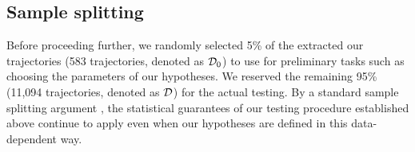 \subsection{Sample splitting}

Before proceeding further, we randomly selected 5\% of the extracted our trajectories (583 trajectories, denoted as $\mathcal{D}_0$) to use for preliminary tasks such as choosing the parameters of our hypotheses.
We reserved the remaining 95\% (11,094 trajectories, denoted as $\mathcal{D}$) for the actual testing.
By a standard sample splitting argument \citep{cox1975note}, the statistical guarantees of our testing procedure established above continue to apply even when our hypotheses are defined in this data-dependent way.


